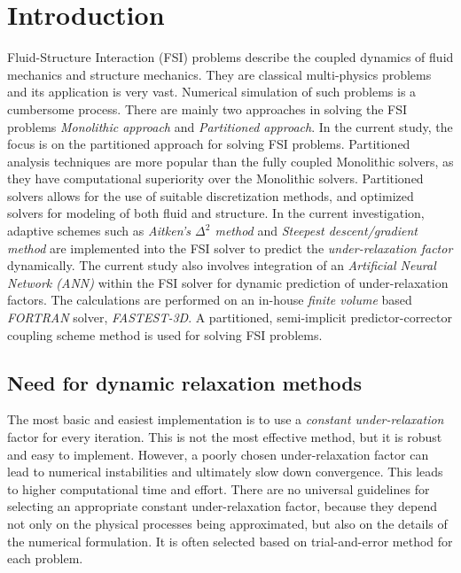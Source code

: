 %
% 


\chapter{Introduction}
Fluid-Structure Interaction (FSI) problems describe the coupled dynamics of fluid mechanics and structure mechanics. They are classical multi-physics problems and its application is very vast. Numerical simulation of such problems is a cumbersome process. There are mainly two approaches in solving the FSI problems \textit{Monolithic approach} and \textit{Partitioned approach}. In the current study, the focus is on the partitioned approach for solving FSI problems. Partitioned analysis techniques are more popular than the fully coupled Monolithic solvers, as they have computational superiority over the Monolithic solvers. Partitioned solvers allows for the use of suitable discretization methods, and optimized solvers for modeling of both fluid and structure. In the current investigation, adaptive schemes such as \textit{Aitken's $\Delta^2$ method} and \textit{Steepest descent/gradient method} are implemented into the FSI solver to predict the \textit{under-relaxation factor} dynamically. The current study also involves integration of an \textit{Artificial Neural Network (ANN)} within the FSI solver for dynamic prediction of under-relaxation factors. The calculations are performed on an in-house \textit{finite volume} based \textit{FORTRAN} solver, \textit{FASTEST-3D}. A partitioned, semi-implicit predictor-corrector coupling scheme method is used for solving FSI problems. 

\section{Need for dynamic relaxation methods}
 
The most basic and easiest implementation is to use a \textit{constant under-relaxation} factor for every iteration. This is not the most effective method, but it is robust and easy to implement. However, a poorly chosen under-relaxation factor can lead to numerical instabilities and ultimately slow down convergence. This leads to higher computational time and effort. There are no universal guidelines for selecting an appropriate constant under-relaxation factor, because they depend not only on the physical processes being approximated, but also on the details of the numerical formulation. It is often selected based on trial-and-error method for each problem.


